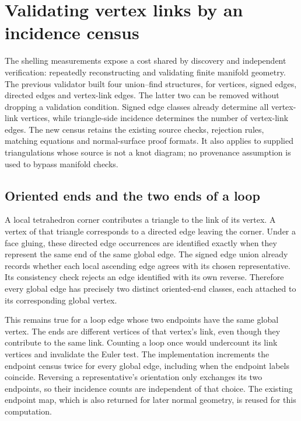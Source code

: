 \section{Validating vertex links by an incidence census}
\label{sec:vertex-link-census}

The shelling measurements expose a cost shared by discovery and independent
verification: repeatedly reconstructing and validating finite manifold
geometry. The previous validator built four union--find structures, for
vertices, signed edges, directed edges and vertex-link edges. The latter two
can be removed without dropping a validation condition. Signed edge classes
already determine all vertex-link vertices, while triangle-side incidence
determines the number of vertex-link edges. The new census retains the
existing source checks, rejection rules, matching equations and normal-surface
proof formats. It also applies to supplied triangulations whose source is not
a knot diagram; no provenance assumption is used to bypass manifold checks.

\subsection{Oriented ends and the two ends of a loop}

A local tetrahedron corner contributes a triangle to the link of its vertex.
A vertex of that triangle corresponds to a directed edge leaving the corner.
Under a face gluing, these directed edge occurrences are identified exactly
when they represent the same end of the same global edge. The signed edge
union already records whether each local ascending edge agrees with its
chosen representative. Its consistency check rejects an edge identified with
its own reverse. Therefore every global edge has precisely two distinct
oriented-end classes, each attached to its corresponding global vertex.

This remains true for a loop edge whose two endpoints have the same global
vertex. The ends are different vertices of that vertex's link, even though
they contribute to the same link. Counting a loop once would undercount its
link vertices and invalidate the Euler test. The implementation increments
the endpoint census twice for every global edge, including when the endpoint
labels coincide. Reversing a representative's orientation only exchanges its
two endpoints, so their incidence counts are independent of that choice.
The existing endpoint map, which is also returned for later normal geometry,
is reused for this computation.

